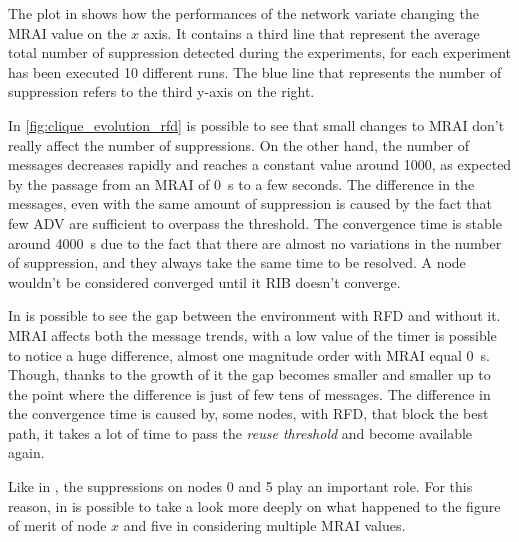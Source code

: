 The plot in  shows how the performances of the
network variate changing the \ac{MRAI} value on the $x$ axis.
It contains a third line that represent the average total number of suppression
detected during the experiments, for each experiment has been executed \num{10} different
runs.
The blue line that represents the number of suppression refers to the third y-axis
on the right.

In \cref{fig:clique_evolution_rfd} is possible to see that small changes to \ac{MRAI}
don't really affect the number of suppressions.
On the other hand, the number of messages decreases rapidly and reaches a constant
value around \num{1000}, as expected by the passage from an \ac{MRAI} of \SI{0}{\second}
to a few seconds.
The difference in the messages, even with the same amount of suppression is caused
by the fact that few \ac{ADV} are sufficient to overpass the threshold.
The convergence time is stable around \SI{4000}{\second} due to the
fact that there are almost no variations in the number of suppression,
and they always take the same time to be resolved.
A node wouldn't be considered converged until it \ac{RIB} doesn't converge.

In  is possible to see the
gap between the environment with \ac{RFD} and without it.
\ac{MRAI} affects both the message trends, with a low value of the timer
is possible to notice a huge difference, almost one magnitude order with \ac{MRAI}
equal \SI{0}{\second}.
Though, thanks to the growth of it the gap becomes smaller and smaller up to
the point where the difference is just of few tens of messages.
The difference in the convergence time is caused by, some
nodes, with \ac{RFD}, that block the best path, it takes a lot of time to
pass the \textit{reuse threshold} and become available again.

Like in , the suppressions on nodes \num{0} and
\num{5} play an important role.
For this reason, in  is possible to
take a look more deeply on what happened to the figure of merit
of node $x$ and five in considering multiple \ac{MRAI} values.

